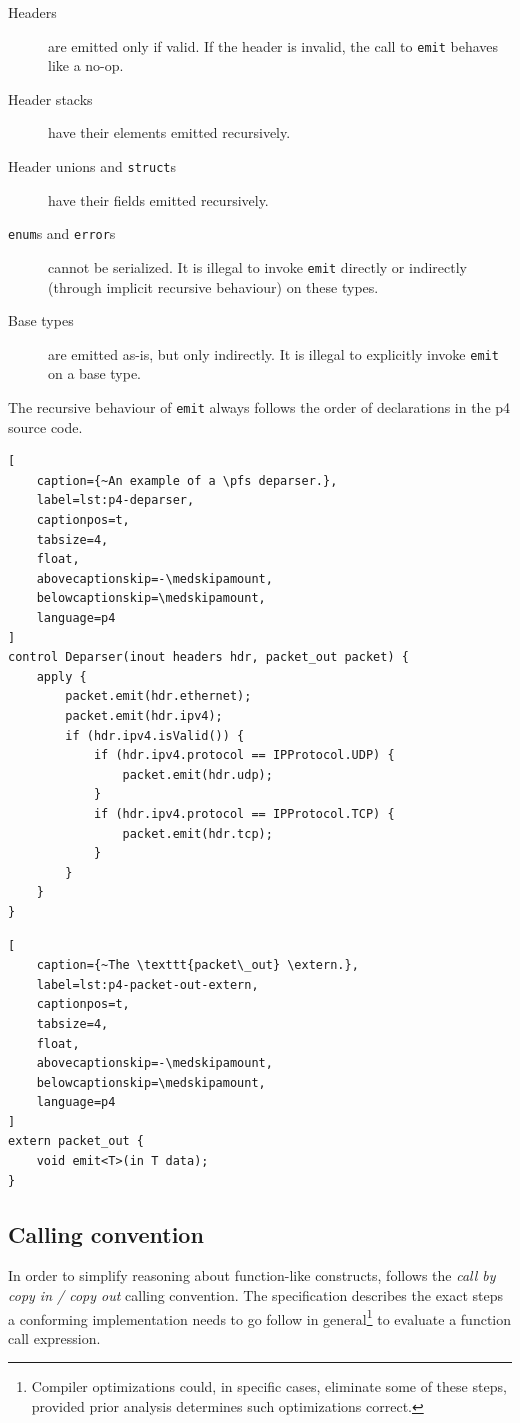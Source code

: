 \begin{description}
	\item[Headers] are emitted only if valid. If the header is invalid, the call
	to \texttt{emit} behaves like a no-op.

	\item[Header stacks] have their elements emitted recursively.

	\item[Header unions and \texttt{struct}s] have their fields emitted
	recursively.

	\item[\texttt{enum}s and \texttt{error}s] cannot be serialized. It is
	illegal to invoke \texttt{emit} directly or indirectly (through implicit
	recursive behaviour) on these types.

	\item[Base types] are emitted as-is, but only indirectly. It is illegal to
	explicitly invoke \texttt{emit} on a base type.
\end{description}

The recursive behaviour of \texttt{emit} always follows the order of
declarations in the \acrshort{p4} source code.

\begin{lstlisting}[
	caption={~An example of a \pfs deparser.},
	label=lst:p4-deparser,
	captionpos=t,
	tabsize=4,
	float,
	abovecaptionskip=-\medskipamount,
	belowcaptionskip=\medskipamount,
	language=p4
]
control Deparser(inout headers hdr, packet_out packet) {
	apply {
		packet.emit(hdr.ethernet);
		packet.emit(hdr.ipv4);
		if (hdr.ipv4.isValid()) {
			if (hdr.ipv4.protocol == IPProtocol.UDP) {
				packet.emit(hdr.udp);
			}
			if (hdr.ipv4.protocol == IPProtocol.TCP) {
				packet.emit(hdr.tcp);
			}
		}
	}
}
\end{lstlisting}

\begin{lstlisting}[
	caption={~The \texttt{packet\_out} \extern.},
	label=lst:p4-packet-out-extern,
	captionpos=t,
	tabsize=4,
	float,
	abovecaptionskip=-\medskipamount,
	belowcaptionskip=\medskipamount,
	language=p4
]
extern packet_out {
	void emit<T>(in T data);
}
\end{lstlisting}

\subsection*{Calling convention} \label{sec:p4-calling-convention}

In order to simplify reasoning about function-like constructs, \pfs follows the
\emph{call by copy in / copy out} calling convention. The specification
describes the exact steps a conforming implementation needs to go follow in
general\footnote{Compiler optimizations could, in specific cases, eliminate some
of these steps, provided prior analysis determines such optimizations correct.}
to evaluate a function call expression.

